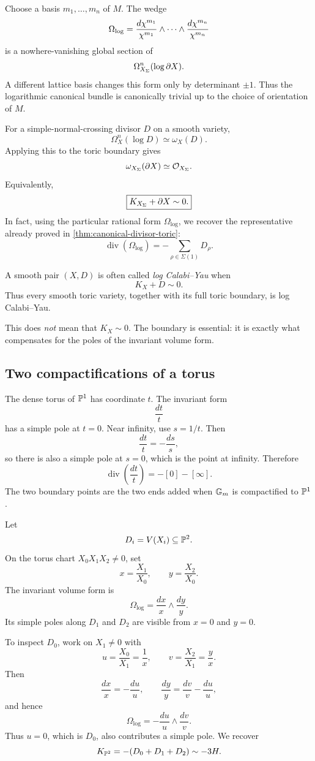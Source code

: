 Choose a basis \(m_1,\dots,m_n\) of \(M\). The wedge
\[
\Omega_{\log}
=
\frac{d\chi^{m_1}}{\chi^{m_1}}
\wedge\cdots\wedge
\frac{d\chi^{m_n}}{\chi^{m_n}}
\]
is a nowhere-vanishing global section of
\[
\Omega^n_{X_\Sigma}(\log\partial X).
\]
A different lattice basis changes this form only by determinant
\(\pm1\). Thus the logarithmic canonical bundle is canonically
trivial up to the choice of orientation of \(M\).

For a simple-normal-crossing divisor \(D\) on a smooth variety,
\[
\Omega_X^n(\log D)
\simeq
\omega_X(D).
\]
Applying this to the toric boundary gives
\[
\omega_{X_\Sigma}(\partial X)
\simeq
\mathcal O_{X_\Sigma}.
\]
Equivalently,
\[
\boxed{
K_{X_\Sigma}+\partial X\sim0.
}
\]
In fact, using the particular rational form \(\Omega_{\log}\), we
recover the representative already proved in
\cref{thm:canonical-divisor-toric}:
\[
\operatorname{div}(\Omega_{\log})
=
-\sum_{\rho\in\Sigma(1)}D_\rho.
\]

\begin{observation}
A smooth pair \((X,D)\) is often called \emph{log Calabi--Yau} when
\[
K_X+D\sim0.
\]
Thus every smooth toric variety, together with its full toric
boundary, is log Calabi--Yau.

This does \emph{not} mean that \(K_X\sim0\). The boundary is essential:
it is exactly what compensates for the poles of the invariant volume
form.
\end{observation}

\subsection{Two compactifications of a torus}

\begin{example}
The dense torus of \(\mathbb{P}^1\) has coordinate \(t\). The invariant form
\[
\frac{dt}{t}
\]
has a simple pole at \(t=0\). Near infinity, use \(s=1/t\). Then
\[
\frac{dt}{t}
=
-\frac{ds}{s},
\]
so there is also a simple pole at \(s=0\), which is the point at
infinity. Therefore
\[
\operatorname{div}\!\left(\frac{dt}{t}\right)
=
-[0]-[\infty].
\]
The two boundary points are the two ends added when \(\mathbb{G}_{m}\) is
compactified to \(\mathbb{P}^1\).
\end{example}

\begin{example}
Let
\[
D_i=V(X_i)\subseteq\mathbb{P}^2.
\]
On the torus chart \(X_0X_1X_2\neq0\), set
\[
x=\frac{X_1}{X_0},
\qquad
y=\frac{X_2}{X_0}.
\]
The invariant volume form is
\[
\Omega_{\log}
=
\frac{dx}{x}\wedge\frac{dy}{y}.
\]
Its simple poles along \(D_1\) and \(D_2\) are visible from
\(x=0\) and \(y=0\).

To inspect \(D_0\), work on \(X_1\neq0\) with
\[
u=\frac{X_0}{X_1}=\frac1x,
\qquad
v=\frac{X_2}{X_1}=\frac yx.
\]
Then
\[
\frac{dx}{x}=-\frac{du}{u},
\qquad
\frac{dy}{y}=\frac{dv}{v}-\frac{du}{u},
\]
and hence
\[
\Omega_{\log}
=
-\frac{du}{u}\wedge\frac{dv}{v}.
\]
Thus \(u=0\), which is \(D_0\), also contributes a simple pole. We
recover
\[
K_{\mathbb{P}^2}=-(D_0+D_1+D_2)\sim-3H.
\]
\end{example}

